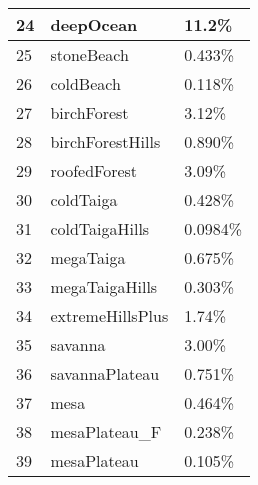 \documentclass{article}
\begin{document}
\begin{tabular}{|l|l|l|}
		24     & deepOcean           & 11.2\%\\\hline
		25     & stoneBeach          & 0.433\%\\\hline
		26     & coldBeach           & 0.118\%\\\hline
		27     & birchForest         & 3.12\%\\\hline
		28     & birchForestHills    & 0.890\%\\\hline
		29     & roofedForest        & 3.09\%\\\hline
		30     & coldTaiga           & 0.428\%\\\hline
		31     & coldTaigaHills      & 0.0984\%\\\hline
		32     & megaTaiga           & 0.675\%\\\hline
		33     & megaTaigaHills      & 0.303\%\\\hline
		34     & extremeHillsPlus    & 1.74\%\\\hline
		35     & savanna             & 3.00\%\\\hline
		36     & savannaPlateau      & 0.751\%\\\hline
		37     & mesa                & 0.464\%\\\hline
		38     & mesaPlateau\_F      & 0.238\%\\\hline
		39     & mesaPlateau         & 0.105\%\\\hline
	\end{tabular}
	\newpage\noindent
\end{document}
